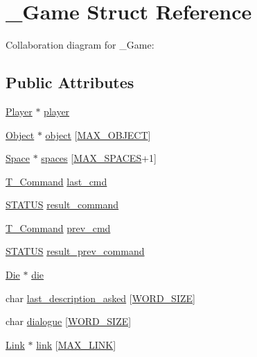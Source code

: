 \hypertarget{struct__Game}{}\section{\+\_\+\+Game Struct Reference}
\label{struct__Game}


Collaboration diagram for \+\_\+\+Game\+:
\subsection*{Public Attributes}
\begin{DoxyCompactItemize}
\item 
\hyperlink{player_8h_af30e2030635a69690f85e48bc6ef202f}{Player} $\ast$ \hyperlink{struct__Game_a31406605782d71ec00c4bf258ea76267}{player}
\item 
\hyperlink{object_8h_a7f8bbcda919b65ce67f92fba08e0212f}{Object} $\ast$ \hyperlink{struct__Game_a8ade6d831e4710c40b0d61004bbd1585}{object} \mbox{[}\hyperlink{game_8h_a7083b26c57d956d72197b9428d8e4894}{M\+A\+X\+\_\+\+O\+B\+J\+E\+CT}\mbox{]}
\item 
\hyperlink{space_8h_a67533ffc2b70463baecc38fb0629bbfc}{Space} $\ast$ \hyperlink{struct__Game_ab4180417d9148f8abb2233ca6c4ecfe5}{spaces} \mbox{[}\hyperlink{space_8h_a5f54fd55f983a2e33ce076cd9f587e82}{M\+A\+X\+\_\+\+S\+P\+A\+C\+ES}+1\mbox{]}
\item 
\hyperlink{command_8h_a0473597db8c45c0289b6b8e2f8abbe32}{T\+\_\+\+Command} \hyperlink{struct__Game_a27727b50ea0904a1fe9e1c55c27f2cf1}{last\+\_\+cmd}
\item 
\hyperlink{types_8h_a32c27cc471df37f4fc818d65de0a56c4}{S\+T\+A\+T\+US} \hyperlink{struct__Game_ab6b04f339d8c214112366e3207164ebb}{result\+\_\+command}
\item 
\hyperlink{command_8h_a0473597db8c45c0289b6b8e2f8abbe32}{T\+\_\+\+Command} \hyperlink{struct__Game_a950475fd323cc097a94b0d67bdad3303}{prev\+\_\+cmd}
\item 
\hyperlink{types_8h_a32c27cc471df37f4fc818d65de0a56c4}{S\+T\+A\+T\+US} \hyperlink{struct__Game_a9b1ff5315a1aeb3b0c66007da129f57a}{result\+\_\+prev\+\_\+command}
\item 
\hyperlink{die_8h_a892f0b0bf81d69a1f7a14ea238e36dd3}{Die} $\ast$ \hyperlink{struct__Game_a0d6009b5dcb080489c192a9198fa7d46}{die}
\item 
char \hyperlink{struct__Game_a21a6bc2ef3fa5217f45c5f2f966ca143}{last\+\_\+description\+\_\+asked} \mbox{[}\hyperlink{types_8h_a92ed8507d1cd2331ad09275c5c4c1c89}{W\+O\+R\+D\+\_\+\+S\+I\+ZE}\mbox{]}
\item 
char \hyperlink{struct__Game_ab7e99423df13d6aff7bb355ba92cbd35}{dialogue} \mbox{[}\hyperlink{types_8h_a92ed8507d1cd2331ad09275c5c4c1c89}{W\+O\+R\+D\+\_\+\+S\+I\+ZE}\mbox{]}
\item 
\hyperlink{link_8h_ae3b299941e67be6971bfd64a25505eff}{Link} $\ast$ \hyperlink{struct__Game_acde062499c7180ecaf3bd36ba64385c6}{link} \mbox{[}\hyperlink{game_8h_abfa744c8ca5b46f7f2a10aea53a4ec59}{M\+A\+X\+\_\+\+L\+I\+NK}\mbox{]}
\end{DoxyCompactItemize}


